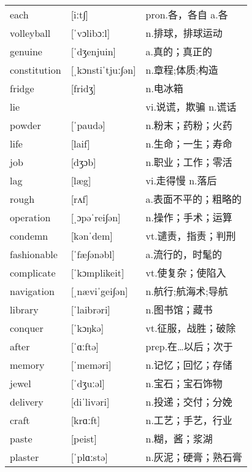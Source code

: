 \documentclass[a4paper]{article}
\begin{document}
\section{}
\begin{tabular}{l l l}

each & [iːt∫] & pron.各，各自 a.各 \\
volleyball & [ˈvɔlibɔːl] & n.排球，排球运动 \\
genuine & [ˈdʒenjuin] & a.真的；真正的 \\
constitution & [ˌkɔnstiˈtjuː∫ən] & n.章程;体质;构造 \\
fridge & [fridʒ] & n.电冰箱 \\
lie &  & vi.说谎，欺骗 n.谎话 \\
powder & [ˈpaudə] & n.粉末；药粉；火药 \\
life & [laif] & n.生命；一生；寿命 \\
job & [dʒɔb] & n.职业；工作；零活 \\
lag & [læg] & vi.走得慢 n.落后 \\
rough & [rʌf] & a.表面不平的；粗略的 \\
operation & [ˌɔpəˈrei∫ən] & n.操作；手术；运算 \\
condemn & [kənˈdem] & vt.谴责，指责；判刑 \\
fashionable & [ˈfæ∫ənəbl] & a.流行的，时髦的 \\
complicate & [ˈkɔmplikeit] & vt.使复杂；使陷入 \\
navigation & [ˌnæviˈgei∫ən] & n.航行;航海术;导航 \\
library & [ˈlaibrəri] & n.图书馆；藏书 \\
conquer & [ˈkɔŋkə] & vt.征服，战胜；破除 \\
after & [ˈɑːftə] & prep.在…以后；次于 \\
memory & [ˈmeməri] & n.记忆；回忆；存储 \\
jewel & [ˈdʒuːəl] & n.宝石；宝石饰物 \\
delivery & [diˈlivəri] & n.投递；交付；分娩 \\
craft & [krɑːft] & n.工艺；手艺，行业 \\
paste & [peist] & n.糊，酱；浆湖 \\
plaster & [ˈplɑːstə] & n.灰泥；硬膏；熟石膏 \\

\end{tabular}
\end{document}
